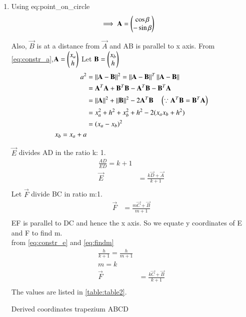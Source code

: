 \begin{enumerate}[label=\thesection.\arabic*.,ref=\thesection.\theenumi]
\item Using {eq:point_on_circle}
\begin{align}
\implies \mathbf{A} &= \begin{pmatrix}\cos \beta \\ -\sin \beta\end{pmatrix}
\label{eq:constr_a}
\end{align}
%

Also, $\vec{B}$ is at a distance from $\vec {A}$ and AB is parallel to x axis. 
\newline
From \eqref{eq:constr_a},$\mathbf{A} = \begin{pmatrix}x_a\\h\end{pmatrix}$ 
Let $\mathbf{B} = \begin{pmatrix}x_b\\h\end{pmatrix}$
\begin{align}
a^2 &=\left\lVert\mathbf{A}-\mathbf{B}\right\rVert^2 = \left\lVert\mathbf{A}-\mathbf{B}\right\rVert^T\left\lVert\mathbf{A}-\mathbf{B}\right\rVert  
\\
&= \mathbf{A}^T\mathbf{A}+\mathbf{B}^T\mathbf{B}-\mathbf{A}^T\mathbf{B} - \mathbf{B}^T\mathbf{A} 
\\
&= \left\lVert\mathbf{A}\right\rVert^2 + \left\lVert\mathbf{B}\right\rVert^2 - 2\mathbf{A}^T\mathbf{B} \quad \left(\because \mathbf{A}^T\mathbf{B} = \mathbf{B}^T\mathbf{A} \right) 
\label{eq:tri_const_norm_ac}
\\
&= x_a^2+h^2+x_b^2+h^2-2(x_a x_b + h^2)
\\
&= \left(x_a-x_b\right)^2
\\
x_b = x_a + a
\\
\label{eq:constr_b}
\end{align}

$\vec{E}$ divides AD in the ratio k: 1. 
\begin{align}
\frac{AD}{ED} = k+1 
\\
\vec{E} &= \frac{{{k\vec{D}} +\vec{A}}}{k+1}
\\
\label{eq:constr_e}
\end{align}
%
Let $\vec{F}$ divide BC in ratio m:1.
\begin{align}
\vec{F} &= \frac{{{m\vec{C}} +\vec{B}}}{m+1}
\\
\label{eq:findm}
\end{align}
EF is parallel to DC and hence the x axis. So we equate y coordinates of E and F to find m.
\\
from \ref{eq:constr_e} and \ref{eq:findm}
\begin{align}
\frac{h}{k+1} = \frac{h}{m+1}
\\
 m = k 
\\
\vec{F} &= \frac{{k\vec{C} +\vec{B}}}{k+1}
\\
\label{eq:constr_f}
\end{align}
%
The values are listed in \ref{table:table2}. 
%
\begin{table}[ht!]
\centering

\caption{Derived coordinates trapezium ABCD}
\label{table:table2}	
\end{table}
 

\end{enumerate}
